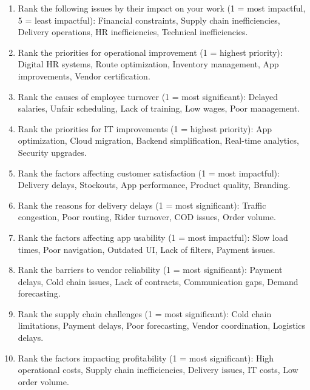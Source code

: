 \documentclass[12pt,a4paper]{article}
\begin{document}
\begin{enumerate}
    \item Rank the following issues by their impact on your work (1 = most impactful, 5 = least impactful): Financial constraints, Supply chain inefficiencies, Delivery operations, HR inefficiencies, Technical inefficiencies.
    \item Rank the priorities for operational improvement (1 = highest priority): Digital HR systems, Route optimization, Inventory management, App improvements, Vendor certification.
    \item Rank the causes of employee turnover (1 = most significant): Delayed salaries, Unfair scheduling, Lack of training, Low wages, Poor management.
    \item Rank the priorities for IT improvements (1 = highest priority): App optimization, Cloud migration, Backend simplification, Real-time analytics, Security upgrades.
\end{enumerate}

\begin{enumerate}
    \setcounter{enumi}{4}
    \item Rank the factors affecting customer satisfaction (1 = most impactful): Delivery delays, Stockouts, App performance, Product quality, Branding.
    \item Rank the reasons for delivery delays (1 = most significant): Traffic congestion, Poor routing, Rider turnover, COD issues, Order volume.
    \item Rank the factors affecting app usability (1 = most impactful): Slow load times, Poor navigation, Outdated UI, Lack of filters, Payment issues.
\end{enumerate}

\begin{enumerate}
    \setcounter{enumi}{7}
    \item Rank the barriers to vendor reliability (1 = most significant): Payment delays, Cold chain issues, Lack of contracts, Communication gaps, Demand forecasting.
    \item Rank the supply chain challenges (1 = most significant): Cold chain limitations, Payment delays, Poor forecasting, Vendor coordination, Logistics delays.
\end{enumerate}

\begin{enumerate}
    \setcounter{enumi}{9}
    \item Rank the factors impacting profitability (1 = most significant): High operational costs, Supply chain inefficiencies, Delivery issues, IT costs, Low order volume.
\end{enumerate}
\end{document}
